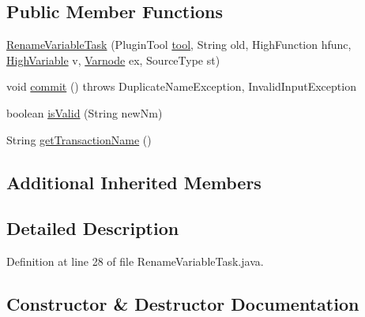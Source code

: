 \subsection*{Public Member Functions}
\begin{DoxyCompactItemize}
\item 
\mbox{\hyperlink{classghidra_1_1app_1_1plugin_1_1core_1_1decompile_1_1actions_1_1_rename_variable_task_a5c1758e1bb2572d033fee64a25305e05}{Rename\+Variable\+Task}} (Plugin\+Tool \mbox{\hyperlink{classghidra_1_1app_1_1plugin_1_1core_1_1decompile_1_1actions_1_1_rename_task_aded3c0474f9fa5697b5b550bc2709597}{tool}}, String old, High\+Function hfunc, \mbox{\hyperlink{class_high_variable}{High\+Variable}} v, \mbox{\hyperlink{class_varnode}{Varnode}} ex, Source\+Type st)
\item 
void \mbox{\hyperlink{classghidra_1_1app_1_1plugin_1_1core_1_1decompile_1_1actions_1_1_rename_variable_task_ae4158a4f03d5b0e48f43bfee4314809b}{commit}} ()  throws Duplicate\+Name\+Exception, Invalid\+Input\+Exception 
\item 
boolean \mbox{\hyperlink{classghidra_1_1app_1_1plugin_1_1core_1_1decompile_1_1actions_1_1_rename_variable_task_acc7ac5e6f22793df98ecabcd2a60f59c}{is\+Valid}} (String new\+Nm)
\item 
String \mbox{\hyperlink{classghidra_1_1app_1_1plugin_1_1core_1_1decompile_1_1actions_1_1_rename_variable_task_a940d8f482c2fd6050e106b280622795a}{get\+Transaction\+Name}} ()
\end{DoxyCompactItemize}
\subsection*{Additional Inherited Members}


\subsection{Detailed Description}


Definition at line 28 of file Rename\+Variable\+Task.\+java.



\subsection{Constructor \& Destructor Documentation}
\mbox{\label{classghidra_1_1app_1_1plugin_1_1core_1_1decompile_1_1actions_1_1_rename_variable_task_a5c1758e1bb2572d033fee64a25305e05}} 
